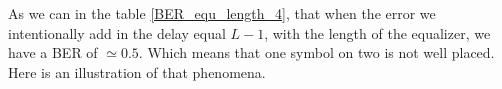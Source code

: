 \documentclass[frenchb, oneside, headings=normal]{scrartcl}
\begin{document}

As we can in the table \ref{BER_equ_length_4}, that when the error we intentionally add in the delay equal $L-1$, with the length of the equalizer, we have a BER of $\simeq 0.5$. Which means that one symbol on two is not well placed. Here is an illustration of that phenomena.
\end{document}
